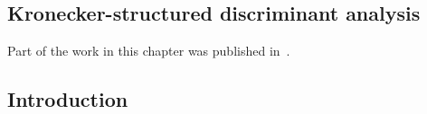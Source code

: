 \newcommand{\pv}[1]{
	#1
}
\begin{refsection}
	\chapter{Kronecker-structured discriminant analysis}


	Part of the work in this chapter was published in~\cite{VanDenKerchove2022}.



	\section{Introduction}




\end{refsection}

